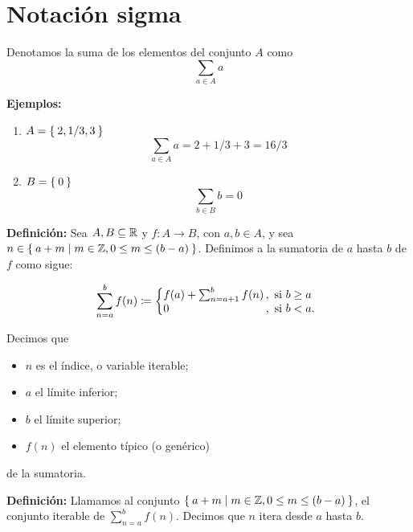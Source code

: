 \part*{Notación sigma}


Denotamos la suma de los elementos del conjunto $A$ como \[\sum_{a\in A} a\]

\textbf{Ejemplos:}

\begin{enumerate}
  \item $A=\Set{2, 1/3, 3}$ \[\sum_{a\in A} a = 2 + 1/3 + 3 = 16/3\]
  \item $B=\Set{0}$ \[\sum_{b\in B} b = 0\]
\end{enumerate}

\textbf{Definición:} Sea $A, B\subseteq \mathbb{R}$ y $f:A \to B$, con $a,b\in A$, y sea $n \in \Set{a + m | m\in \mathbb{Z}, 0\leq m \leq (b-a)}$. Definimos a la sumatoria de $a$ hasta $b$ de $f$ como sigue:

\[
    \sum_{n=a}^{b} f(n) \defined \left\{
    \begin{array}{@{}l@{\thinspace}l}
    f(a) + \sum_{n=a+1}^{b} f(n) &,  \ \text{si}  \ b\geq a\\
    0 &,  \ \text{si}  \ b<a.
    \end{array} \right. \]

Decimos que
\begin{itemize}
  \item $n$ es el índice, o variable iterable;
  \item $a$ el límite inferior;
  \item $b$ el límite superior;
  \item $f(n)$ el elemento típico (o genérico)
\end{itemize}
de la sumatoria.

\textbf{Definición:} Llamamos al conjunto $\Set{a + m | m\in \mathbb{Z}, 0\leq m \leq (b-a)}$, el conjunto iterable de $\sum_{n=a}^{b} f(n)$. Decimos que $n$ itera desde $a$ hasta $b$.

